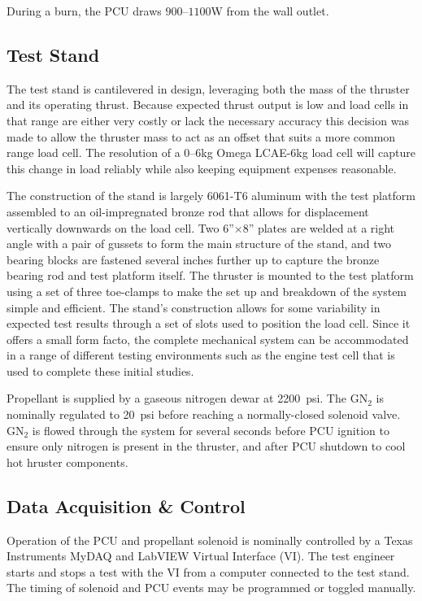 \documentclass[journal]{IEEEtran}
\begin{document}
During a burn, the PCU draws $900$--$1100$\si{\watt} from the wall outlet.

\subsection{Test Stand}
The test stand is cantilevered in design, leveraging both the mass of the thruster and its operating thrust.
Because expected thrust output is low and load cells in that range are either very costly or lack the necessary accuracy this decision was made to allow the thruster mass to act as an offset that suits a more common range load cell.
The resolution of a 0--6\si{\kilo\gram} Omega LCAE-6kg load cell will capture this change in load reliably while also keeping equipment expenses reasonable.

The construction of the stand is largely 6061-T6 aluminum with the test platform assembled to an oil-impregnated bronze rod that allows for displacement vertically downwards on the load cell.
Two 6''$\times$8'' plates are welded at a right angle with a pair of gussets to form the main structure of the stand, and two bearing blocks are fastened several inches further up to capture the bronze bearing rod and test platform itself.
The thruster is mounted to the test platform using a set of three toe-clamps to make the set up and breakdown of the system simple and efficient.
The stand's construction allows for some variability in expected test results through a set of slots used to position the load cell. Since it offers a small form facto, the complete mechanical system can be accommodated in a range of different testing environments such as the engine test cell that is used to complete these initial studies.

Propellant is supplied by a gaseous nitrogen dewar at \SI{2200}{psi}.
The GN$_2$ is nominally regulated to \SI{20}{psi} before reaching a normally-closed solenoid valve.
GN$_2$ is flowed through the system for several seconds before PCU ignition to ensure only nitrogen is present in the thruster, and after PCU shutdown to cool hot hruster components.

\subsection{Data Acquisition \& Control}
Operation of the PCU and propellant solenoid is nominally controlled by a Texas Instruments MyDAQ and LabVIEW Virtual Interface (VI).
The test engineer starts and stops a test with the VI from a computer connected to the test stand. The timing of solenoid and PCU events may be programmed or toggled manually.
\end{document}

